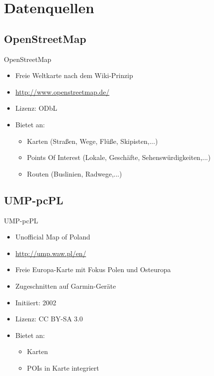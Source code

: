\documentclass{beamer}
\begin{document}
\section{Datenquellen}
\subsection{OpenStreetMap}
\begin{frame}{OpenStreetMap}
  \begin{itemize}
    \item Freie Weltkarte nach dem Wiki-Prinzip
    \item \url{http://www.openstreetmap.de/}
    \item Lizenz: ODbL
    \item Bietet an:
    \begin{itemize}
      \item Karten (Straßen, Wege, Flüße, Skipisten,...)
      \item Points Of Interest (Lokale, Geschäfte,
        Sehenswürdigkeiten,...)
      \item Routen (Buslinien, Radwege,...)
    \end{itemize}
  \end{itemize}
\end{frame}
\subsection{UMP-pcPL}
\begin{frame}{UMP-pcPL}
  \begin{itemize}
    \item Unofficial Map of Poland
    \item \url{http://ump.waw.pl/en/}
    \item Freie Europa-Karte mit Fokus Polen und Osteuropa
    \item Zugeschnitten auf Garmin-Geräte
    \item Initiiert: 2002
    \item Lizenz: CC BY-SA 3.0
    \item Bietet an:
    \begin{itemize}
      \item Karten
      \item POIs in Karte integriert
    \end{itemize}
  \end{itemize}
\end{frame}
\end{document}
